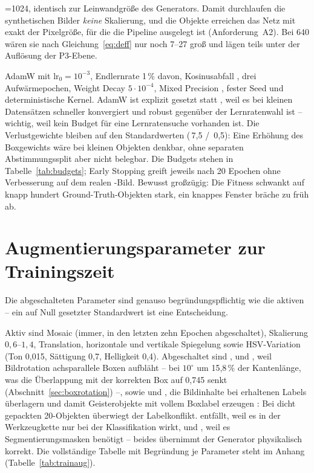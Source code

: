  =1024, identisch zur Leinwandgröße des
Generators. Damit durchlaufen die synthetischen Bilder \emph{keine} Skalierung,
und die Objekte erreichen das Netz mit exakt der Pixelgröße, für die die Pipeline
ausgelegt ist (Anforderung~A2). Bei 640\px{} wären sie nach Gleichung~\eqref{eq:deff} nur noch 7--27\px{} groß
und lägen teils unter der Auflösung der P3-Ebene.

 AdamW \parencite{loshchilov2019} mit
$\text{lr}_0 = 10^{-3}$, Endlernrate 1\,\% davon, Kosinusabfall
\parencite{loshchilov2017sgdr}, drei Aufwärmepochen, Weight Decay $5\cdot10^{-4}$,
Mixed Precision \parencite{micikevicius2018}, fester Seed und
deterministische Kernel. AdamW ist explizit gesetzt statt , weil es
bei kleinen Datensätzen schneller konvergiert und robust gegenüber der
Lernratenwahl ist -- wichtig, weil kein Budget für eine Lernratensuche vorhanden
ist. Die Verlustgewichte bleiben auf den Standardwerten
(\,7,5 / \,0,5): Eine Erhöhung des Boxgewichts wäre bei
kleinen Objekten denkbar, ohne separaten Abstimmungssplit aber nicht belegbar.
Die Budgets stehen in Tabelle~\ref{tab:budgets}; Early Stopping greift jeweils
nach 20 Epochen ohne Verbesserung auf dem realen -Bild. Bewusst
großzügig: Die Fitness schwankt auf knapp hundert Ground-Truth-Objekten stark,
ein knappes Fenster bräche zu früh ab.

\section{Augmentierungsparameter zur Trainingszeit}
\label{sec:trainparam}

Die abgeschalteten Parameter sind genauso begründungspflichtig wie die aktiven --
ein auf Null gesetzter Standardwert ist eine Entscheidung.

Aktiv sind Mosaic (immer, in den letzten zehn Epochen abgeschaltet), Skalierung
$0{,}6$--$1{,}4$, Translation, horizontale und vertikale Spiegelung sowie
HSV-Variation (Ton 0,015, Sättigung 0,7, Helligkeit 0,4). Abgeschaltet sind
,  und , weil Bildrotation
achsparallele Boxen aufbläht -- bei $10^\circ$ um 15,8\,\% der Kantenlänge, was
die Überlappung mit der korrekten Box auf 0,745 senkt
(Abschnitt~\ref{sec:boxrotation}) --, sowie  und , die
Bildinhalte bei erhaltenen Labels überlagern und damit Geisterobjekte mit vollem
Boxlabel erzeugen \parencite{zhang2018mixup,yun2019cutmix}: Bei dicht gepackten
20\px-Objekten überwiegt der Labelkonflikt.  entfällt, weil es in
der Werkzeugkette nur bei der Klassifikation wirkt, und ,
weil es Segmentierungsmasken benötigt -- beides übernimmt der Generator
physikalisch korrekt. Die vollständige Tabelle mit Begründung je Parameter steht
im Anhang (Tabelle~\ref{tab:trainaug}).

